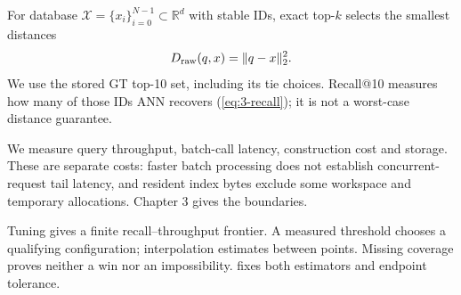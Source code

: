 For database $\mathcal X=\{x_i\}_{i=0}^{N-1}\subset\mathbb R^d$ with stable IDs, exact top-$k$ selects the smallest distances
\begin{equation}
 D_{\mathrm{raw}}(q,x)=\|q-x\|_2^2.
 \label{eq:2-raw}
\end{equation}
We use the stored GT top-10 set, including its tie choices. Recall@10 measures how many of those IDs ANN recovers (\cref{eq:3-recall}); it is not a worst-case distance guarantee.

We measure query throughput, batch-call latency, construction cost and storage. These are separate costs: faster batch processing does not establish concurrent-request tail latency, and resident index bytes exclude some workspace and temporary allocations. Chapter 3 gives the boundaries.

Tuning gives a finite recall--throughput frontier. A measured threshold chooses a qualifying configuration; interpolation estimates between points. Missing coverage proves neither a win nor an impossibility.  fixes both estimators and endpoint tolerance.